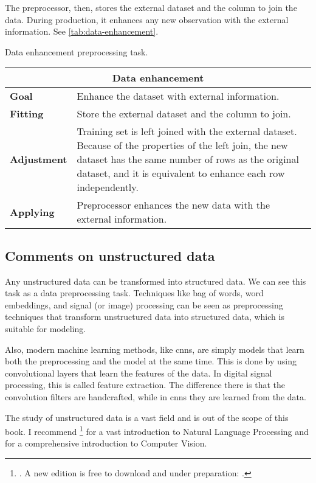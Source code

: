 The preprocessor, then, stores the external dataset and the column to join the data.
During production, it enhances any new observation with the external information.  See
\cref{tab:data-enhancement}.

\begin{tablebox}[label=tab:data-enhancement]{Data enhancement preprocessing task.}
  \centering
  \begin{tabular}{lp{6cm}}
    \toprule
    \multicolumn{2}{c}{\textbf{Data enhancement}} \\
    \midrule
    \textbf{Goal} &
      Enhance the dataset with external information. \\
    \textbf{Fitting} &
      Store the external dataset and the column to join. \\
    \textbf{Adjustment} &
      Training set is left joined with the external dataset.  Because of the properties of
      the left join, the new dataset has the same number of rows as the original dataset,
      and it is equivalent to enhance each row independently.  \\
    \textbf{Applying} &
      Preprocessor enhances the new data with the external information. \\
    \bottomrule
  \end{tabular}
\end{tablebox}

\subsection{Comments on unstructured data}

Any unstructured data can be transformed into structured data.  We can see this task as a
data preprocessing task.  Techniques like bag of words, word embeddings, and signal (or
image) processing can be seen as preprocessing techniques that transform unstructured data
into structured data, which is suitable for modeling.

Also, modern machine learning methods, like \glspl{cnn}, are simply models that learn both
the preprocessing and the model at the same time.  This is done by using convolutional
layers that learn the features of the data.  In digital signal processing, this is called
feature extraction.  The difference there is that the convolution filters are handcrafted,
while in \glspl{cnn} they are learned from the data.

The study of unstructured data is a vast field and is out of the scope of this book.  I
recommend \citeauthor{Jurafsky2008}\footnote{. A new edition is
free to download and under preparation: .} for a vast
introduction to Natural Language Processing and
\citeauthor{Szeliski2022} for a comprehensive introduction to
Computer Vision.

